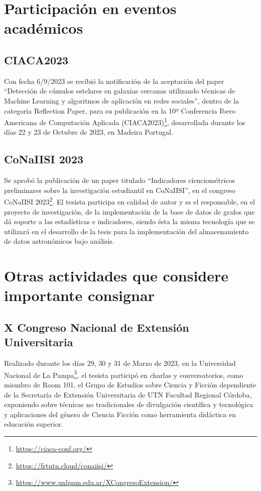 \documentclass[
	11pt,oneside,a4paper,
	fleqn,
	article
]{memoir}
\begin{document}
\section {Participación en eventos académicos}

\subsection{CIACA2023}

Con fecha 6/9/2023 se recibió la notificación de la aceptación del paper ``Detección de cúmulos estelares en galaxias cercanas utilizando técnicas de Machine Learning y algoritmos de aplicación en redes sociales'', dentro de la categoría Reflection Paper, para su publicación en la 10º Conferencia Ibero Americana de Computación Aplicada (CIACA2023)\footnote{\href{https://ciaca-conf.org/}{https://ciaca-conf.org/}}, desarrollada durante los días 22 y 23 de Octubre de 2023, en Madeira Portugal.

\subsection{CoNaIISI 2023}

Se aprobó la publicación de un paper titulado ``Indicadores cienciométricos preliminares sobre la investigación estudiantil en CoNaIISI'', en el congreso CoNaIISI 2023\footnote{\href{https://frtutn.cloud/conaiisi/}{https://frtutn.cloud/conaiisi/}}. El tesista participa en calidad de autor y es el responsable, en el proyecto de investigación, de la implementación de la base de datos de grafos que dá soporte a las estadísticas e indicadores, siendo ésta la misma tecnología que se utilizará en el desarrollo de la tesis para la implementación del almacenamiento de datos astronómicos bajo análisis.


\section {Otras actividades que considere importante consignar}

\subsection{X Congreso Nacional de Extensión Universitaria}

Realizado durante los días 29, 30 y 31 de Marzo de 2023, en la Universidad Nacional de La Pampa\footnote{\href{https://www.unlpam.edu.ar/XCongresoExtension/}{https://www.unlpam.edu.ar/XCongresoExtension/}}, el tesista participó en charlas y conversatorios, como miembro de Room 101, el Grupo de Estudios sobre Ciencia y Ficción dependiente de la Secretaría de Extensión Universitaria de UTN Facultad Regional Córdoba, exponiendo sobre técnicas no tradicionales de divulgación científica y tecnológica y aplicaciones del género de Ciencia Ficción como herramienta didáctica en educación superior.
\end{document}
